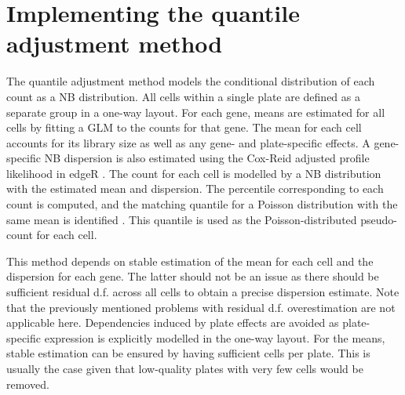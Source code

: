 \documentclass{article}
\begin{document}
\section{Implementing the quantile adjustment method}
The quantile adjustment method models the conditional distribution of each count as a NB distribution.
All cells within a single plate are defined as a separate group in a one-way layout.
For each gene, means are estimated for all cells by fitting a GLM to the counts for that gene.
The mean for each cell accounts for its library size as well as any gene- and plate-specific effects.
A gene-specific NB dispersion is also estimated using the Cox-Reid adjusted profile likelihood in edgeR \citep{mccarthy2012differential}.
The count for each cell is modelled by a NB distribution with the estimated mean and dispersion.
The percentile corresponding to each count is computed, and the matching quantile for a Poisson distribution with the same mean is identified \citep{robinson2008small}.
This quantile is used as the Poisson-distributed pseudo-count for each cell.

This method depends on stable estimation of the mean for each cell and the dispersion for each gene.
The latter should not be an issue as there should be sufficient residual d.f. across all cells to obtain a precise dispersion estimate.
Note that the previously mentioned problems with residual d.f. overestimation are not applicable here.
Dependencies induced by plate effects are avoided as plate-specific expression is explicitly modelled in the one-way layout.
For the means, stable estimation can be ensured by having sufficient cells per plate.
This is usually the case given that low-quality plates with very few cells would be removed.
\end{document}
